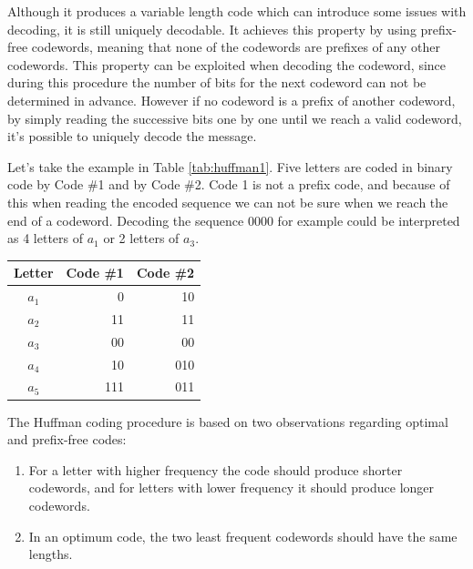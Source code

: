       Although it produces a variable length code which can introduce some issues with decoding, it is still uniquely decodable. It achieves this property by using prefix-free codewords, meaning that none of the codewords are prefixes of any other codewords. This property can be exploited when decoding the codeword, since during this procedure the number of bits for the next codeword can not be determined in advance. However if no codeword is a prefix of another codeword, by simply reading the successive bits one by one until we reach a valid codeword, it's possible to uniquely decode the message.

      Let's take the example in Table \ref{tab:huffman1}. Five letters are coded in binary code by Code \#1 and by Code \#2. Code 1 is not a prefix code, and because of this when reading the encoded sequence we can not be sure when we reach the end of a codeword. Decoding the sequence 0000 for example could be interpreted as 4 letters of $a_1$ or 2 letters of $a_3$.

      \begin{table}
        \centering
        \begin{tabular}{crr}
          \toprule
          Letter & Code \#1 & Code \#2 \\
          \midrule
          $a_1$ & 0	& 10 \\
          $a_2$ & 11	& 11 \\
          $a_3$ & 00	& 00 \\
          $a_4$ & 10 	& 010 \\
          $a_5$ & 111	& 011 \\
          \bottomrule
        \end{tabular}
        \label{tab:prefix}
      \end{table}

      The Huffman coding procedure is based on two observations regarding optimal and prefix-free codes:
      \begin{enumerate}
        \item For a letter with higher frequency the code should produce shorter codewords, and for letters with lower frequency it should produce longer codewords.
        \item In an optimum code, the two least frequent codewords should have the same lengths.
      \end{enumerate}

